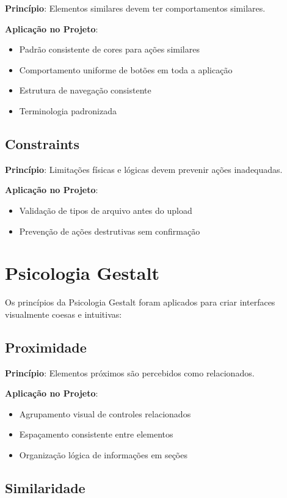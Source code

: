 \textbf{Princípio}: Elementos similares devem ter comportamentos similares.

\textbf{Aplicação no Projeto}:
\begin{itemize}
    \item Padrão consistente de cores para ações similares
    \item Comportamento uniforme de botões em toda a aplicação
    \item Estrutura de navegação consistente
    \item Terminologia padronizada
\end{itemize}

\subsection{Constraints}

\textbf{Princípio}: Limitações físicas e lógicas devem prevenir ações inadequadas.

\textbf{Aplicação no Projeto}:
\begin{itemize}
    \item Validação de tipos de arquivo antes do upload
    \item Prevenção de ações destrutivas sem confirmação
\end{itemize}

\section{Psicologia Gestalt}

Os princípios da Psicologia Gestalt foram aplicados para criar interfaces visualmente coesas e intuitivas:

\subsection{Proximidade}

\textbf{Princípio}: Elementos próximos são percebidos como relacionados.

\textbf{Aplicação no Projeto}:
\begin{itemize}
    \item Agrupamento visual de controles relacionados
    \item Espaçamento consistente entre elementos
    \item Organização lógica de informações em seções
\end{itemize}

\subsection{Similaridade}

